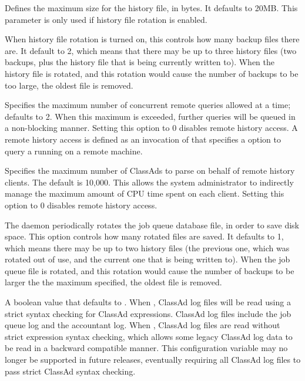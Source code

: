 \begin{description}
\label{param:MaxHistoryLog}
\item[\Macro{MAX\_HISTORY\_LOG}]
  Defines the maximum size for the history file, in bytes. It defaults
  to 20MB. This parameter is only used if history file rotation is
  enabled. 

\label{param:MaxHistoryRotations}
\item[\Macro{MAX\_HISTORY\_ROTATIONS}]
  When history file rotation is turned on, this controls how many
  backup files there are. It default to 2, which means that there may
  be up to three history files (two backups, plus the history file
  that is being currently written to). When the history file is
  rotated, and this rotation would cause the number of backups to be
  too large, the oldest file is removed. 

\label{param:HistoryHelperMaxConcurrency}
\item[\Macro{HISTORY\_HELPER\_MAX\_CONCURRENCY}]
  Specifies the maximum number of concurrent remote 
  queries allowed at a time; defaults to 2.  When this maximum is exceeded,
  further queries will be queued in a non-blocking manner. Setting this option
  to 0 disables remote history access. A remote history access is defined
  as an invocation of  that specifies a  option
  to query a  running on a remote machine.

\label{param:HistoryHelperMaxHistory}
\item[\Macro{HISTORY\_HELPER\_MAX\_HISTORY}]
  Specifies the maximum number of ClassAds to parse on behalf of remote history
  clients.  The default is 10,000.  This allows the system administrator to
  indirectly manage the maximum amount of CPU time spent on each client.
  Setting this option to 0 disables remote history access.

\label{param:MaxJobQueueLogRotations}
\item[\Macro{MAX\_JOB\_QUEUE\_LOG\_ROTATIONS}]
  The  daemon periodically rotates the job queue database file,
  in order to save disk space.  
  This option controls how many rotated files are saved.  
  It defaults to 1, which means there may be up to two history
  files (the previous one, which was rotated out of use, and the current one
  that is being written to).  When the job queue file is rotated,
  and this rotation would cause the number of backups to be larger
  the the maximum specified, the oldest file is removed.

\label{param:ClassadLogStrictParsing}
\item[\Macro{CLASSAD\_LOG\_STRICT\_PARSING}]
  A boolean value that defaults to . 
  When , ClassAd log files will be read using 
  a strict syntax checking for ClassAd expressions.  
  ClassAd log files include the job queue log and the accountant log.
  When , 
  ClassAd log files are read without strict expression syntax checking, 
  which allows some legacy ClassAd log data to be read in a backward
  compatible manner.  
  This configuration variable may no longer be supported in future releases, 
  eventually requiring all ClassAd log files to pass strict 
  ClassAd syntax checking. 


\end{description}
